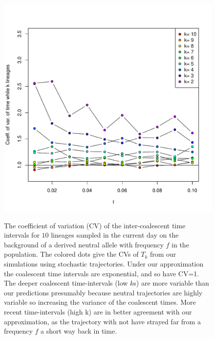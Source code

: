 \documentclass[a4paper,10pt]{article}
\begin{document}
\begin{figure}
	\includegraphics[width = \textwidth]{../Paper_Figures/coeff_var_coal_times.pdf} \label{coeff_var_coal_times_supp_plot}
\caption{The coefficient of variation (CV) of the inter-coalescent time intervals for $10$ lineages sampled in the current day on the background of a derived neutral allele with frequency $f$ in the population. The colored dots give the CVs of $T_k$ from our simulations using stochastic trajectories. Under our approximation the coalescent time intervals are exponential, and so have CV=1. The deeper coalescent time-intervals (low $k$s) are more variable than our predictions presumably because neutral trajectories are highly variable so increasing the variance of the coalescent times. More recent time-intervals (high k) are in better agreement with our approximation, as the trajectory with not have strayed far from a frequency $f$ a short way back in time. }
\end{figure} %
\end{document}
